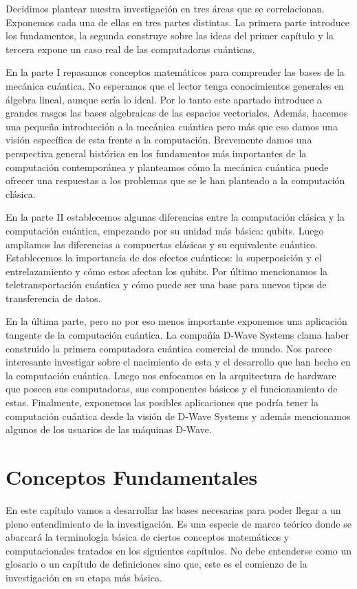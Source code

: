 \documentclass[11pt,a4paper]{article}
\begin{document}
Decidimos plantear nuestra investigación en tres áreas que se correlacionan. Exponemos cada una de ellas en tres partes distintas. La primera parte introduce los fundamentos, la segunda construye sobre las ideas del primer capítulo y la tercera expone un caso real de las computadoras cuánticas. 

En la parte I repasamos conceptos matemáticos para comprender las bases de la mecánica cuántica. No esperamos que el lector tenga conocimientos generales en álgebra lineal, aunque sería lo ideal. Por lo tanto este apartado introduce a grandes rasgos las bases algebraicas de las espacios vectoriales. Además, hacemos una pequeña introducción a la mecánica cuántica pero más que eso damos una visión específica de esta frente a la computación. Brevemente damos una perspectiva general histórica en los fundamentos más importantes de la computación contemporánea y planteamos cómo la mecánica cuántica puede ofrecer una respuestas a los problemas que se le han planteado a la computación clásica. 

En la parte II establecemos algunas diferencias entre la computación clásica y la computación cuántica, empezando por su unidad más básica: qubits. Luego ampliamos las diferencias a compuertas clásicas y su equivalente cuántico. Establecemos la importancia de dos efectos cuánticos: la superposición y el entrelazamiento y cómo estos afectan los qubits. Por último mencionamos la teletransportación cuántica y cómo puede ser una base para nuevos tipos de transferencia de datos.

En la última parte, pero no por eso menos importante exponemos una aplicación tangente de la computación cuántica. La compañía D-Wave Systems clama haber construido la primera computadora cuántica comercial de mundo. Nos parece interesante investigar sobre el nacimiento de esta y el desarrollo que han hecho en la computación cuántica. Luego nos enfocamos en la arquitectura de hardware que poseen sus computadoras, sus componentes básicos y el funcionamiento de estas. Finalmente, exponemos las posibles aplicaciones que podría tener la computación cuántica desde la visión de D-Wave Systems y además mencionamos algunos de los usuarios de las máquinas D-Wave.

\clearpage
\part{Conceptos Fundamentales}

En este capítulo vamos a desarrollar las bases necesarias para poder llegar a un pleno entendimiento de la investigación. Es una especie de marco teórico donde se abarcará la terminología básica de ciertos conceptos matemáticos y computacionales tratados en los siguientes capítulos. No debe entenderse como un glosario o un capítulo de definiciones sino que, este es el comienzo de la investigación en su etapa más básica.
\end{document}
